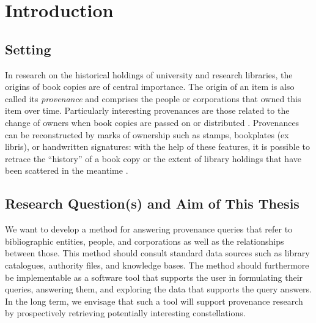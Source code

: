\chapter{Introduction}
\label{chap:intro}

\section{Setting}
\label{sec:setting}

In research on the historical holdings of university and research libraries,
the origins of book copies are of central importance.
The origin of an item is also called its \emph{provenance} 
and comprises the people or corporations that owned this item over time.
Particularly interesting provenances are those related to the change of
owners when book copies are passed on or distributed \autocite[p.\,2]{Hakelberg2016}.
Provenances can be reconstructed by marks of ownership
such as stamps, bookplates (ex libris), or handwritten signatures:
with the help of these features, it is possible to retrace
the ``history'' of a book copy
or the extent of library holdings that have been scattered in the meantime \autocite[p.\,2]{Hakelberg2016}.




\section{Research Question(s) and Aim of This Thesis}
\label{sec:research_questions}


We want to develop a method for answering provenance queries that refer to bibliographic entities, people, and corporations
as well as the relationships between those. This method should consult standard data sources such as 
library catalogues, authority files, and knowledge bases. The method should furthermore be implementable as a software tool
that supports the user in formulating their queries, answering them, and exploring the data that supports the query answers.
In the long term, we envisage that such a tool will support provenance research
by prospectively retrieving potentially interesting constellations.

